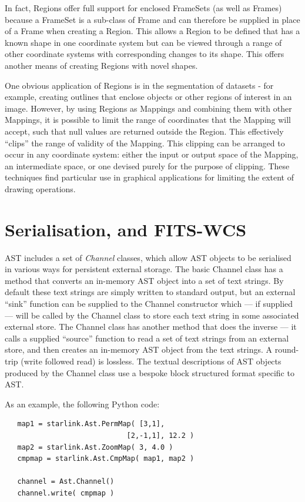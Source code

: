 \documentclass[final,authoryear,5p,times,twocolumn]{elsarticle}
\begin{document}
In fact, Regions offer full support for enclosed FrameSets (as well as
Frames) because a FrameSet is a sub-class of Frame and can therefore be
supplied in place of a Frame when creating a Region. This allows a Region
to be defined that has a known shape in one coordinate system but can be
viewed through a range of other coordinate systems with corresponding
changes to its shape. This offers another means of creating Regions with
novel shapes.

One obvious application of Regions is in the segmentation of datasets -
for example, creating outlines that enclose objects or other regions of
interest in an image. However, by using Regions as Mappings and combining
them with other Mappings, it is possible to limit the range of
coordinates that the Mapping will accept, such that null values are
returned outside the Region. This effectively ``clips'' the range of
validity of the Mapping. This clipping can be arranged to occur in any
coordinate system: either the input or output space of the Mapping, an
intermediate space, or one devised purely for the purpose of clipping.
These techniques find particular use in graphical applications for
limiting the extent of drawing operations.

\section{Serialisation, and FITS-WCS}
AST includes a set of \emph{Channel} classes, which allow AST objects to
be serialised in various ways for persistent external storage. The basic
Channel class has a method that converts an in-memory AST object into a set
of text strings. By default
these text strings are simply written to standard output, but an external
``sink'' function can be supplied to the Channel constructor which --- if
supplied --- will be called by the Channel class to store each text
string in some associated external store. The Channel class has another
method that does the inverse --- it calls a supplied ``source''
function to read a set of text strings from an external store, and then
creates an in-memory AST object from the text strings. A round-trip
(write followed read) is lossless. The textual descriptions of
AST objects produced by the Channel class use a bespoke block structured
format specific to AST.

As an example, the following Python code:

\begin{lstlisting}
   map1 = starlink.Ast.PermMap( [3,1],
                             [2,-1,1], 12.2 )
   map2 = starlink.Ast.ZoomMap( 3, 4.0 )
   cmpmap = starlink.Ast.CmpMap( map1, map2 )

   channel = Ast.Channel()
   channel.write( cmpmap )
\end{lstlisting}
\end{document}
